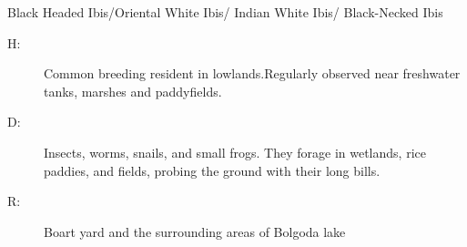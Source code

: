 \begin{itemize}
\begin{enumerate}
Black Headed Ibis/Oriental White Ibis/ Indian White Ibis/ Black{-}Necked Ibis%
\begin{description}%
\item[H: ]%
Common breeding resident in lowlands.Regularly observed near freshwater tanks, marshes and paddyfields.%
\item[D: ]%
Insects, worms, snails, and small frogs. They forage in wetlands, rice paddies, and fields, probing the ground with their long bills.%
\item[R: ]%
Boart yard and the surrounding areas of Bolgoda lake%
\end{description}%
\end{enumerate}%
\end{itemize}